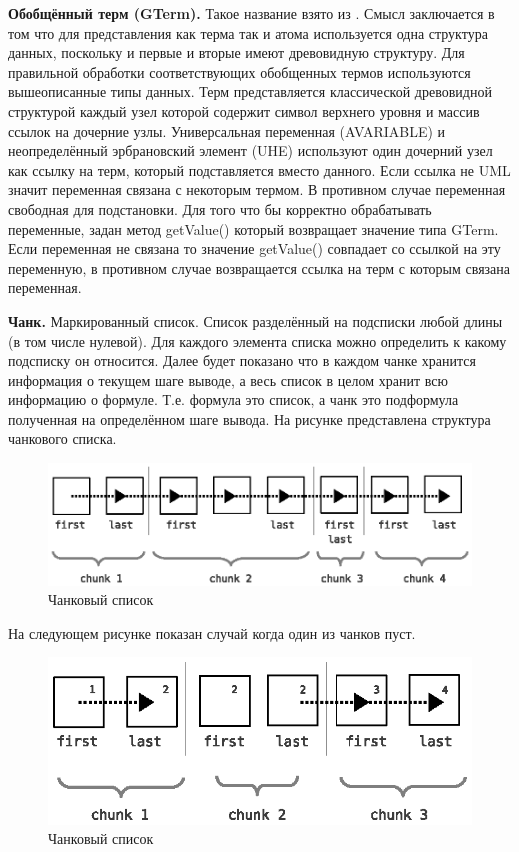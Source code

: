 \textbf{Обобщённый терм (GTerm).} Такое название взято из \cite{NNN}. Смысл заключается в том что для представления как терма так и атома используется одна структура данных, поскольку и первые и вторые имеют древовидную структуру. Для правильной обработки соответствующих обобщенных термов используются вышеописанные типы данных. Терм представляется классической древовидной структурой каждый узел которой содержит символ верхнего уровня и массив ссылок на дочерние узлы. Универсальная переменная (AVARIABLE) и неопределённый эрбрановский элемент (UHE) используют один дочерний узел как ссылку на терм, который подставляется вместо данного. Если ссылка не UML значит переменная связана с некоторым термом. В противном случае переменная свободная для подстановки. Для того что бы корректно обрабатывать переменные, задан метод getValue() который возвращает значение типа GTerm. Если переменная не связана то значение getValue() совпадает со ссылкой на эту переменную, в противном случае возвращается ссылка на терм с которым связана переменная.

\textbf{Чанк.} Маркированный список. Список разделённый на подсписки любой длины (в том числе нулевой). Для каждого элемента списка можно определить к какому подсписку он относится. Далее будет показано что в каждом чанке хранится информация о текущем шаге выводе, а весь список в целом хранит всю информацию о формуле. Т.е. формула это список, а чанк это подформула полученная на определённом шаге вывода. На рисунке представлена структура чанкового списка.

\begin{figure}[h]
	\centering
	\includegraphics[width=0.6\linewidth]{pics/Chunk.eps}
	\caption{Чанковый список}
	\label{fig:chank1}
\end{figure}

На следующем рисунке показан случай когда один из чанков пуст.

\begin{figure}[h]
	\centering
	\includegraphics[width=0.6\linewidth]{pics/Chunk2.eps}
	\caption{Чанковый список}
	\label{fig:chank2}
\end{figure}

